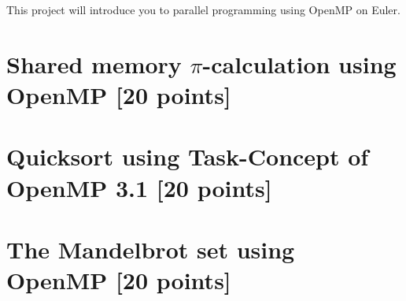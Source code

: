 \documentclass[unicode,11pt,a4paper,oneside,numbers=endperiod,openany]{scrartcl}
\begin{document}
\setassignment
{}

\newline

\assignmentpolicy
This project will introduce you to parallel programming using OpenMP on Euler.


\section{Shared memory $\pi$-calculation using OpenMP [20 points]}



\section{Quicksort using Task-Concept of OpenMP 3.1 [20 points]}



\section{The Mandelbrot set  using OpenMP [20 points]}



\end{document}
